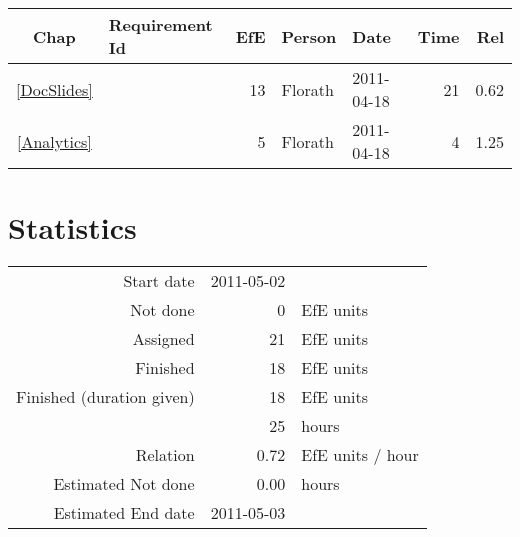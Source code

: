{\small \begin{longtable}{|c|p{5.5cm}||r|l|l|r|r|} \hline
\textbf{Chap} & \textbf{Requirement Id} & \textbf{EfE} & \textbf{Person} & \textbf{Date} & \textbf{Time} & \textbf{Rel} \\ \hline\endhead
\ref{DocSlides} & \nameref{DocSlides} & 13 & Florath & 2011-04-18 & 21 & 0.62 \\ \hline
\ref{Analytics} & \nameref{Analytics} & 5 & Florath & 2011-04-18 & 4 & 1.25 \\ \hline
\end{longtable}}\section{Statistics}
\begin{longtable}{rrl}
Start date & 2011-05-02 & \\ 
Not done & 0 & EfE units \\ 
Assigned & 21 & EfE units \\ 
Finished & 18 & EfE units \\ 
Finished (duration given) & 18 & EfE units \\ 
 & 25 & hours \\ 
Relation & 0.72 & EfE units / hour \\ 
Estimated Not done & 0.00 & hours \\ 
Estimated End date & 2011-05-03 & \\ 
\end{longtable}